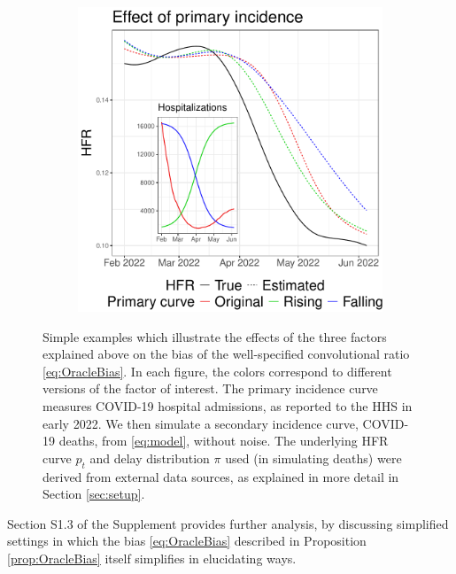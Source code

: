 \documentclass{article}
\begin{document}
\begin{figure}[htb]
\begin{subfigure}[b]{0.325\linewidth}
  \caption{}
  \label{fig:toy_delay}
\end{subfigure}
\begin{subfigure}[b]{0.325\linewidth}
  \centering
  \includegraphics[width=\linewidth]{Figures/Simulated/toy_chging_primary.pdf} 
  \caption{}
  \label{fig:toy_primary}
\end{subfigure}
\caption{Simple examples which illustrate the effects of the three factors
  explained above on 
  the bias of the well-specified convolutional ratio \eqref{eq:OracleBias}.
  In each figure, the colors correspond to different versions of the factor of interest.
  The primary incidence curve measures COVID-19 hospital admissions, as
  reported to the HHS in early 2022. We then simulate a secondary incidence
  curve, COVID-19 deaths, from \eqref{eq:model}, without noise. The underlying  
  HFR curve $p_t$ and delay distribution $\pi$ used (in simulating deaths) were 
  derived from external data sources, as explained in more detail in Section
  \ref{sec:setup}. }      
\label{fig:wellspecified}
\end{figure}
      
Section S1.3 of the Supplement provides further analysis, by discussing 
simplified settings in which the bias \eqref{eq:OracleBias} described in
Proposition \ref{prop:OracleBias} itself simplifies in elucidating ways.   
\end{document}
